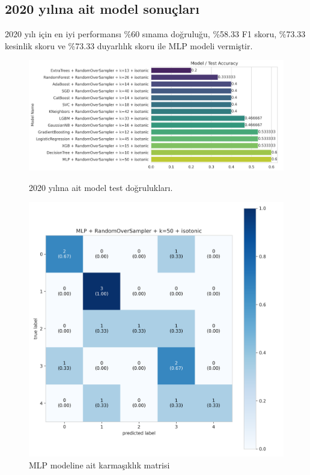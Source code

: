 \newpage

\subsection{2020 yılına ait model sonuçları}
2020 yılı için en iyi performansı \%60 sınama doğruluğu,  \%58.33 F1 skoru, \%73.33 kesinlik skoru ve \%73.33 duyarlılık skoru ile MLP modeli vermiştir.

\begin{figure}[ht]
\centering
\begin{minipage}[b]{0.6\textwidth}
    \centering
    \includegraphics[width=\textwidth]{2020.png}
    \caption{2020 yılına ait model test doğrulukları.}
    \label{fig:resim1}
\end{minipage}
\hfill
\begin{minipage}[b]{0.6\textwidth}
    \centering
    \includegraphics[width=\textwidth]{2020_cm.png}
    \caption{MLP modeline ait karmaşıklık matrisi}
    \label{fig:resim2}
\end{minipage}
\end{figure}

